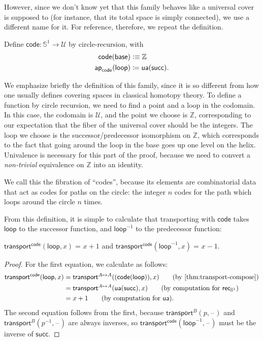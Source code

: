 \documentclass[10pt,a4paper]{article}
\providecommand{\index}[1]{}
\newcommand{\defeq}{\vcentcolon\equiv}  %
\newcommand{\rec}[1]{\mathsf{rec}_{#1}}
\newcommand{\id}[3][]{\ensuremath{#2 =_{#1} #3}\xspace}
\newcommand{\defid}{\coloneqq}
\newcommand{\opp}[1]{\mathord{{#1}^{-1}}}
\newcommand{\transfib}[3]{\ensuremath{\mathsf{transport}^{#1}(#2,#3)\xspace}}
\newcommand{\mapfunc}[1]{\ensuremath{\mathsf{ap}_{#1}}\xspace} %
\newcommand{\map}[2]{\ensuremath{{#1}\mathopen{}\left({#2}\right)\mathclose{}}\xspace}
\let\apfunc\mapfunc
\let\ap\map
\newcommand{\UU}{\ensuremath{\mathcal{U}}\xspace}
\let\type\UU
\newcommand{\ua}{\ensuremath{\mathsf{ua}}\xspace} %
\newcommand{\Sn}{\mathbb{S}}
\newcommand{\base}{\ensuremath{\mathsf{base}}\xspace}
\newcommand{\lloop}{\ensuremath{\mathsf{loop}}\xspace}
\newcommand{\blank}{\mathord{\hspace{1pt}\text{--}\hspace{1pt}}}
\newcommand{\Z}{\ensuremath{\mathbb{Z}}\xspace}
\newcommand{\Zsuc}{\mathsf{succ}}
\newcommand{\code}{\ensuremath{\mathsf{code}}\xspace}
\theoremstyle{definition}
\theoremstyle{remark}
\numberwithin{equation}{section}
\begin{document}
However, since we don't know yet that this family behaves like a universal cover is supposed to (for instance, that its total space is simply connected), we use a different name for it.
For reference, therefore, we repeat the definition.
\index{integers}

\begin{defn}[Universal Cover of $\Sn^1$] \label{S1-universal-cover}
  Define $\code : \Sn ^1 \to \type$ by circle-recursion, with
  \begin{align*}
    \code(\base) &\defeq \Z \\
    \apfunc{\code}({\lloop}) &\defid \ua(\Zsuc).
  \end{align*}
\end{defn}

We emphasize briefly the definition of this family, since it is so different from how one usually defines covering spaces in classical homotopy theory.
To define a function by circle recursion, we need to find a point and a
loop in the codomain.  In this case, the codomain is $\type$, and the point
we choose is $\Z$, corresponding to our expectation that the
fiber of the universal cover should be the integers.  The loop we choose
is the successor/predecessor
\index{successor!isomorphism on Z@isomorphism on $\Z$}%
\index{predecessor!isomorphism on Z@isomorphism on $\Z$}%
isomorphism on $\Z$, which
corresponds to the fact that going around the loop in the base goes up
one level on the helix.  Univalence is necessary for this part of the
proof, because we need to convert a \emph{non-trivial} equivalence on $\Z$ into an identity.

We call this the fibration of ``codes'', because its elements are combinatorial data that act as codes for paths on the circle: the integer $n$ codes for the path which loops around the circle $n$ times.

From this definition, it is simple to calculate that transporting with
$\code$ takes $\lloop$ to the successor function, and
$\opp{\lloop}$ to the predecessor function:

\begin{lem} \label{lem:transport-s1-code}
\id{\transfib \code \lloop x} {x + 1} and
\id{\transfib \code {\opp \lloop} x} {x - 1}.
\end{lem}
\begin{proof}
For the first equation, we calculate as follows:
\begin{align}
{\transfib \code \lloop x}
&= \transfib {A \mapsto A} {(\ap{\code}{\lloop})} x \tag{by \cref{thm:transport-compose}}\\
&= \transfib {A \mapsto A} {\ua (\Zsuc)} x \tag{by computation for $\rec{\Sn^1}$}\\
&= x + 1 \tag{by computation for \ua}.
\end{align}
The second equation follows from the first, because $\transfib{B}{p}{\blank}$ and $\transfib{B}{\opp p}{\blank}$ are always inverses, so $\transfib\code {\opp \lloop}{\blank}$ must be the inverse of $\Zsuc$.
\end{proof}
\end{document}
